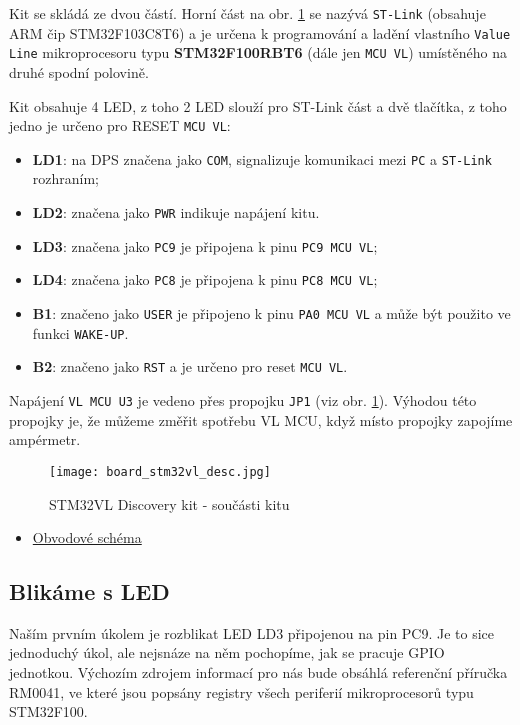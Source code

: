    Kit se skládá ze dvou částí. Horní část na obr. \ref{MIT:fig_stm32_desc} se nazývá 
    \texttt{ST-Link} (obsahuje ARM čip STM32F103C8T6) a je určena k programování a ladění vlastního 
    \texttt{Value Line} mikroprocesoru typu \textbf{STM32F100RBT6} (dále jen \texttt{MCU VL}) 
    umístěného na druhé spodní polovině.
  
    Kit obsahuje 4 LED, z toho 2 LED slouží pro ST-Link část a dvě tlačítka, z toho jedno je určeno 
    pro RESET \texttt{MCU VL}:
    \begin{itemize}[noitemsep]
      \item {\color{red} \textbf{LD1}}: na DPS značena jako \texttt{COM}, signalizuje komunikaci 
            mezi \texttt{PC} a \texttt{ST-Link} rozhraním;
      \item {\color{red} \textbf{LD2}}: značena jako \texttt{PWR} indikuje napájení kitu.
      \item {\color{blue} \textbf{LD3}}: značena jako \texttt{PC9} je připojena k pinu \texttt{PC9 
             MCU VL};
      \item {\color{green} \textbf{LD4}}: značena jako \texttt{PC8} je připojena k pinu   
            \texttt{PC8 MCU VL};
      \item \textbf{B1}: značeno jako \texttt{USER} je připojeno k pinu \texttt{PA0 MCU VL} a může 
            být použito ve funkci \texttt{WAKE-UP}.
      \item \textbf{B2}: značeno jako \texttt{RST} a je určeno pro reset \texttt{MCU VL}.
    \end{itemize}
    
    Napájení \texttt{VL MCU U3} je vedeno přes propojku \texttt{JP1} (viz obr. 
    \ref{MIT:fig_stm32_desc}). Výhodou této propojky je, že můžeme změřit spotřebu VL MCU, když 
    místo 
    propojky zapojíme ampérmetr.
    \begin{figure}[ht!] %
      \centering
      \texttt{[image: board\_stm32vl\_desc.jpg]}
      \caption{STM32VL Discovery kit - součásti kitu}
      \label{MIT:fig_stm32_desc}
    \end{figure}
    
    \begin{itemize}[noitemsep]
      \item \href{http://librarian/stable.php?id=142}{Obvodové schéma}
    \end{itemize}
    
    \subsection{Blikáme s LED}
      Naším prvním úkolem je rozblikat LED LD3 připojenou na pin PC9. Je to sice jednoduchý úkol, 
      ale 
      nejsnáze na něm pochopíme, jak se pracuje GPIO jednotkou. Výchozím zdrojem informací pro nás 
      bude obsáhlá referenční příručka RM0041, ve které jsou popsány registry všech periferií 
      mikroprocesorů typu STM32F100.


